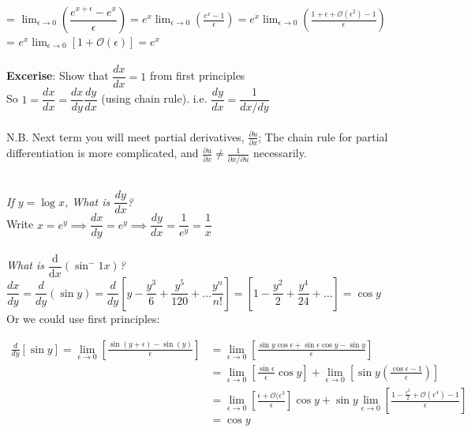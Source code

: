= $\displaystyle{
\lim_{\epsilon \to 0} 
\left(\dfrac{e^{x + \epsilon} - e^x}{\epsilon}\right) 
= e^x \lim_{\epsilon \to 0}
\left(\frac{e^x - 1}{\epsilon}\right) 
= e^x \lim_{\epsilon \to 0} 
\left(\frac{1 + \epsilon + \mathcal{O}(\epsilon ^2) -1}{\epsilon} \right) 
}$\\

= $\displaystyle{
e^x \lim_{\epsilon \to 0} 
[1 + \mathcal{O}(\epsilon)] = e^x
}$\\\\

\textbf{Excerise}: Show that $\dfrac{dx}{dx} = 1$ from first principles\\

So $1 = \dfrac{dx}{dx} = \dfrac{dx}{dy}\dfrac{dy}{dx}$ (using chain rule). i.e. $\boxed{\dfrac{dy}{dx} = \dfrac{1}{dx/dy}}$\\\\


N.B. Next term you will meet partial derivatives, $\frac{\partial u}{\partial x}$; The chain rule for partial differentiation is more complicated, and $\frac{\partial u}{\partial x} \neq \frac{1}{\partial x / \partial u}$ necessarily.\\\\


\textit{If $y = \log x$, What is $\dfrac{dy}{dx}$?}\\

Write $x = e^y \implies \dfrac{dx}{dy} = e^y \implies \dfrac{dy}{dx} = \dfrac{1}{e^y} = \dfrac{1}{x}$\\\\

\textit{What is $\dfrac{\mathrm{d}}{\mathrm{d}x} (\sin^-1 x)$?}\\

$\dfrac{dx}{dy} 
= \dfrac{d}{dy}(\sin y) 
= \dfrac{d}{dy}
\left[y - \dfrac{y^3}{6} + \dfrac{y^5}{120} + \dots \dfrac{y^n}{n!}\right] 
= \left[1 - \dfrac{y^2}{2} + \dfrac{y^4}{24} + \dots\right]
= \cos y
$\\

Or we could use first principles:

\[\begin{align} \nonumber \frac{d}{dy}[\sin y] 
= \lim_{\epsilon \to 0}
\left[\frac{\sin(y+\epsilon) - \sin(y)}{\epsilon} \right]
&=\lim_{\epsilon \to 0}
 \left[\frac{\sin y \cos \epsilon + \sin \epsilon \cos y - \sin y}{\epsilon} \right] 
 \\ \nonumber
&= \lim_{\epsilon \to 0}
\left[\frac{\sin \epsilon}{\epsilon}\cos y\right]
+ \lim_{\epsilon \to 0}
\left[\sin y \left(\frac{\cos \epsilon -1}{\epsilon} \right) \right]
\\ \nonumber
&=\lim_{\epsilon \to 0}
\left[\frac{\epsilon + \mathcal{O}(\epsilon^3}{\epsilon} \right]\cos y
+ \sin y \lim_{\epsilon \to 0}
\left[\frac{1-\frac{\epsilon^2}{2} + \mathcal{O}(\epsilon^4) -1}{\epsilon}\right]
\\ \nonumber
&= \cos y
\end{align}
\]


